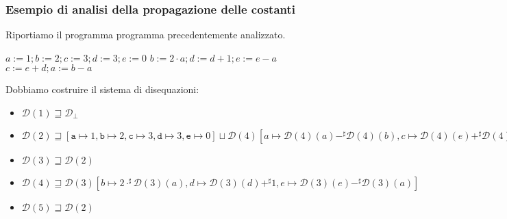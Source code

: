 \subsubsection{Esempio di analisi della propagazione delle costanti}

\begin{minipage}{0.5\textwidth}
    Riportiamo il programma programma precedentemente analizzato.

    \begin{algorithm}[H]
        $a:=1; b:=2; c:=3; d:=3; e:=0$\;
        {
            $b := 2 \cdot a; d:=d+1; e:=e-a$\;
            $c :=e + d; a:= b - a$\;
        }
    \end{algorithm}
\end{minipage}
\begin{minipage}{0.5\textwidth}
    \begin{figure}[H]
        \centering
    \end{figure}
\end{minipage}
Dobbiamo costruire il sistema di disequazioni:
\begin{itemize}
    \item $ \mathcal{D}(1) \sqsupseteq \mathcal{D}_\bot$
    \item $ \mathcal{D}(2) \sqsupseteq [\texttt{a} \mapsto 1, \texttt{b} 
    \mapsto 2, \texttt{c} \mapsto 3, \texttt{d} \mapsto 3, \texttt{e} \mapsto 0] 
    \sqcup \mathcal{D}(4)[a \mapsto \mathcal{D}(4)(a) -^{\sharp} \mathcal{D}(4)(b), 
    c \mapsto \mathcal{D}(4)(e) +^{\sharp} \mathcal{D}(4)(d)]$
    \item $ \mathcal{D}(3) \sqsupseteq \mathcal{D}(2)$
    \item $ \mathcal{D}(4) \sqsupseteq \mathcal{D}(3)[b \mapsto 2 \cdot^{\sharp} 
    \mathcal{D}(3)(a), d \mapsto \mathcal{D}(3)(d) +^{\sharp} 1, 
    e \mapsto \mathcal{D}(3)(e) -^{\sharp} \mathcal{D}(3)(a)]$
    \item $ \mathcal{D}(5) \sqsupseteq \mathcal{D}(2)$
\end{itemize} 
